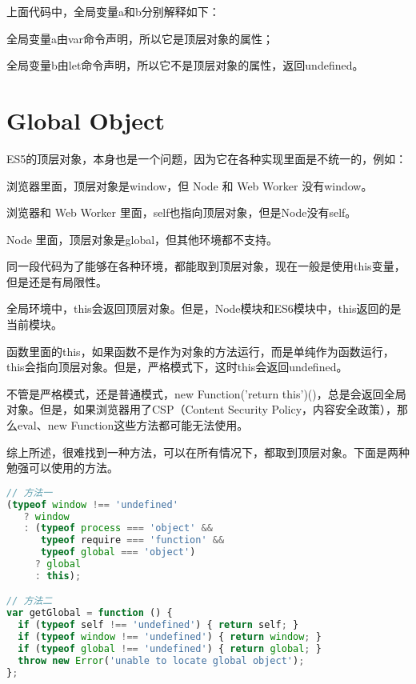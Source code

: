 上面代码中，全局变量a和b分别解释如下：

\begin{compactitem}
\item 全局变量a由var命令声明，所以它是顶层对象的属性；
\item 全局变量b由let命令声明，所以它不是顶层对象的属性，返回undefined。
\end{compactitem}


\section{Global Object}


ES5的顶层对象，本身也是一个问题，因为它在各种实现里面是不统一的，例如：

\begin{compactitem}
\item 浏览器里面，顶层对象是window，但 Node 和 Web Worker 没有window。
\item 浏览器和 Web Worker 里面，self也指向顶层对象，但是Node没有self。
\item Node 里面，顶层对象是global，但其他环境都不支持。
\end{compactitem}

同一段代码为了能够在各种环境，都能取到顶层对象，现在一般是使用this变量，但是还是有局限性。

\begin{compactitem}
\item 全局环境中，this会返回顶层对象。但是，Node模块和ES6模块中，this返回的是当前模块。
\item 函数里面的this，如果函数不是作为对象的方法运行，而是单纯作为函数运行，this会指向顶层对象。但是，严格模式下，这时this会返回undefined。
\item 不管是严格模式，还是普通模式，new Function('return this')()，总是会返回全局对象。但是，如果浏览器用了CSP（Content Security Policy，内容安全政策），那么eval、new Function这些方法都可能无法使用。
\end{compactitem}

综上所述，很难找到一种方法，可以在所有情况下，都取到顶层对象。下面是两种勉强可以使用的方法。

\begin{lstlisting}[language=JavaScript]
// 方法一
(typeof window !== 'undefined'
   ? window
   : (typeof process === 'object' &&
      typeof require === 'function' &&
      typeof global === 'object')
     ? global
     : this);

// 方法二
var getGlobal = function () {
  if (typeof self !== 'undefined') { return self; }
  if (typeof window !== 'undefined') { return window; }
  if (typeof global !== 'undefined') { return global; }
  throw new Error('unable to locate global object');
};
\end{lstlisting}

